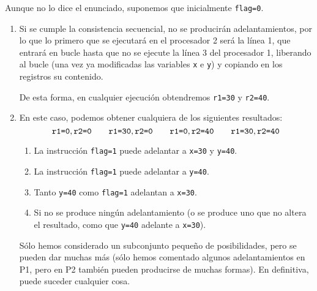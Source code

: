 \begin{ejercicio}
Aunque no lo dice el enunciado, suponemos que inicialmente \verb|flag=0|.
\begin{enumerate}
    \item Si se cumple la consistencia secuencial, no se producirán adelantamientos, por lo que lo primero que se ejecutará en el procesador 2 será la línea 1, que entrará en bucle hasta que no se ejecute la línea 3 del procesador 1, liberando al bucle (una vez ya modificadas las variables \verb|x| e \verb|y|) y copiando en los registros su contenido.

        De esta forma, en cualquier ejecución obtendremos \verb|r1=30| y \verb|r2=40|.

    \item En este caso, podemos obtener cualquiera de los siguientes resultados:
        \begin{equation*}
            \verb|r1=0|, \verb|r2=0| \qquad \verb|r1=30|, \verb|r2=0| \qquad \verb|r1=0|, \verb|r2=40| \qquad \verb|r1=30|, \verb|r2=40|
        \end{equation*}
        \begin{enumerate}
            \item La instrucción \verb|flag=1| puede adelantar a \verb|x=30| y \verb|y=40|.
            \item La instrucción \verb|flag=1| puede adelantar a \verb|y=40|.
            \item Tanto \verb|y=40| como \verb|flag=1| adelantan a \verb|x=30|.
            \item Si no se produce ningún adelantamiento (o se produce uno que no altera el resultado, como que \verb|y=40| adelante a \verb|x=30|).
        \end{enumerate}
        Sólo hemos considerado un subconjunto pequeño de posibilidades, pero se pueden dar muchas más (sólo hemos comentado algunos adelantamientos en P1, pero en P2 también pueden producirse de muchas formas). En definitiva, puede suceder cualquier cosa.
\end{enumerate}

\end{ejercicio}

